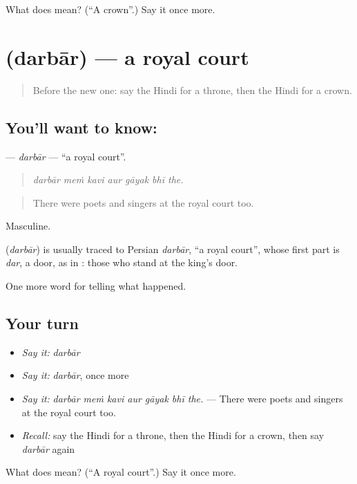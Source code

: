 \begin{tcolorbox}[breakable,colback=teal!4,colframe=teal!35!black,title={Before you move on}]
What does  mean? (\textquotedblleft{}A crown\textquotedblright{}.) Say it once more.
\end{tcolorbox}
\section[\texorpdfstring{\hi{दरबार} (darbār)}{दरबार (darbār)}]{ (darbār) — a royal court}

\label{lesson:HI-C320-darbar}



\begin{quote}
Before the new one: say the Hindi for a throne, then the Hindi for a crown.
\end{quote}

\subsection*{You'll want to know: }
\textbf{} — \emph{darbār} — \textquotedblleft{}a royal court\textquotedblright{}.

\begin{quote}
      
\end{quote}

\begin{quote}
\emph{darbār meṁ kavi aur gāyak bhī the.}
\end{quote}

\begin{quote}
There were poets and singers at the royal court too.
\end{quote}

Masculine.

\begin{cousinweb}
\textbf{} (\emph{darbār}) is usually traced to Persian \emph{darbār}, \textquotedblleft{}a royal court\textquotedblright{}, whose first part is \emph{dar}, a door, as in \textbf{}: those who stand at the king's door.
\end{cousinweb}

\begin{grammarlens}[title={What you've built}]
One more word for telling what happened.
\end{grammarlens}

\subsection*{Your turn}
\begin{itemize}
\raggedright
  \item \emph{Say it:} \emph{darbār}
  \item \emph{Say it:} \emph{darbār}, once more
  \item \emph{Say it:} \emph{darbār meṁ kavi aur gāyak bhī the.} — There were poets and singers at the royal court too.
  \item \emph{Recall:} say the Hindi for a throne, then the Hindi for a crown, then say \emph{darbār} again
\end{itemize}

\begin{tcolorbox}[breakable,colback=teal!4,colframe=teal!35!black,title={Before you move on}]
What does  mean? (\textquotedblleft{}A royal court\textquotedblright{}.) Say it once more.
\end{tcolorbox}
